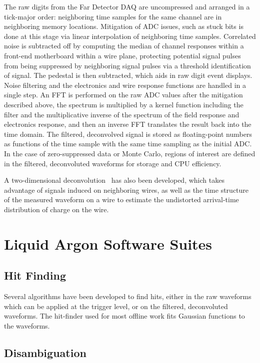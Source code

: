 The raw digits from the Far Detector DAQ are uncompressed and arranged in a tick-major order: neighboring
time samples for the same channel are in neighboring memory locations.  Mitigation of ADC issues, such as
stuck bits is done at this stage via linear interpolation of neighboring time samples.  Correlated noise
is subtracted off by computing the median of channel responses within a front-end motherboard within a wire plane,
protecting potential signal pulses from being suppressed by neighboring signal pulses via a threshold identification
of signal.  The pedestal is then subtracted, which aids in raw digit event displays.
Noise filtering and the electronics and wire response functions are handled in a single step.
An FFT is performed on the raw ADC values after the mitigation described above, the spectrum is multiplied by
a kernel function including the filter and the multiplicative inverse of the spectrum of the field response and
electronics response, and then an inverse FFT translates the result back into the time domain.  The filtered,
deconvolved signal is stored as floating-point numbers as functions of the time sample with the same time sampling
as the initial ADC.  In the case of zero-suppressed data or Monte Carlo, regions of interest are defined in the
filtered, deconvoluted waveforms for storage and CPU efficiency.

A two-dimensional deconvolution~\cite{wirecell} has also been developed, which takes advantage of signals
induced on neighboring wires, as well as the time structure of the measured waveform on a wire to estimate the
undistorted arrival-time distribution of charge on the wire.

\section{Liquid Argon Software Suites}

\subsection{Hit Finding}

Several algorithms have been developed to find hits, either in the raw waveforms which can be applied at the
trigger level, or on the filtered, deconvoluted waveforms.  The hit-finder used for most offline work fits
Gaussian functions to the waveforms.   

\subsection{Disambiguation}

